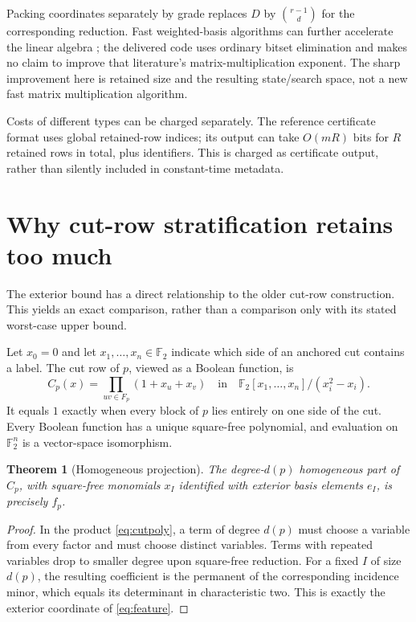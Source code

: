 \documentclass[11pt,a4paper]{article}
\newtheorem{theorem}{Theorem}[section]
\theoremstyle{remark}\newtheorem{remark}[theorem]{Remark}
\newcommand{\F}{\mathbb F_2}
\begin{document}
Packing coordinates separately by grade replaces $D$ by $\binom{r-1}{d}$ for the corresponding reduction. Fast weighted-basis algorithms can further accelerate the linear algebra \cite{bk}; the delivered code uses ordinary bitset elimination and makes no claim to improve that literature's matrix-multiplication exponent. The sharp improvement here is retained size and the resulting state/search space, not a new fast matrix multiplication algorithm.

Costs of different types can be charged separately. The reference certificate format uses global retained-row indices; its output can take $O(mR)$ bits for $R$ retained rows in total, plus identifiers. This is charged as certificate output, rather than silently included in constant-time metadata.

\section{Why cut-row stratification retains too much}\label{sec:cut}
The exterior bound has a direct relationship to the older cut-row construction. This yields an exact comparison, rather than a comparison only with its stated worst-case upper bound.

Let $x_0=0$ and let $x_1,\ldots,x_n\in\F$ indicate which side of an anchored cut contains a label. The cut row of $p$, viewed as a Boolean function, is
\begin{equation}\label{eq:cutpoly}
 C_p(x)=\prod_{uv\in F_p}(1+x_u+x_v)
 \quad\text{in}\quad
 \F[x_1,\ldots,x_n]/(x_i^2-x_i).
\end{equation}
It equals $1$ exactly when every block of $p$ lies entirely on one side of the cut. Every Boolean function has a unique square-free polynomial, and evaluation on $\F^n$ is a vector-space isomorphism.

\begin{theorem}[Homogeneous projection]\label{thm:homogeneous}
The degree-$d(p)$ homogeneous part of $C_p$, with square-free monomials $x_I$ identified with exterior basis elements $e_I$, is precisely $f_p$.
\end{theorem}
\begin{proof}
In the product \eqref{eq:cutpoly}, a term of degree $d(p)$ must choose a variable from every factor and must choose distinct variables. Terms with repeated variables drop to smaller degree upon square-free reduction. For a fixed $I$ of size $d(p)$, the resulting coefficient is the permanent of the corresponding incidence minor, which equals its determinant in characteristic two. This is exactly the exterior coordinate of \eqref{eq:feature}.
\end{proof}
\end{document}
